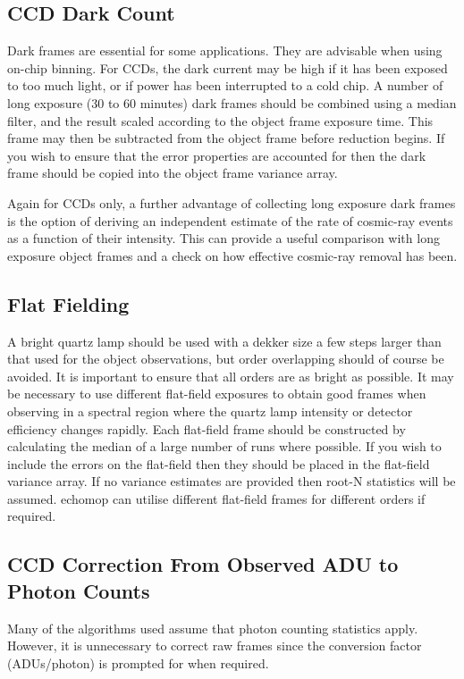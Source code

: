 \subsection{CCD Dark Count}
Dark frames are essential for some applications. They are advisable when
using on-chip binning. For CCDs, the dark current may be high if it has
been exposed to too much light, or if power has been interrupted to a cold
chip. A number of long exposure (30 to 60 minutes) dark frames should be
combined using a median filter, and the result scaled according to the
object frame exposure time. This frame may then be subtracted from the
object frame before reduction begins. If you wish to ensure that the
error properties are accounted for then the dark frame should be copied
into the object frame variance array.

Again for CCDs only, a further advantage of collecting long exposure
dark frames is the option of deriving an independent estimate of the
rate of cosmic-ray events as a function of their intensity.  This can
provide a useful comparison with long exposure object frames and a check
on how effective cosmic-ray removal has been.

\subsection{Flat Fielding}

A bright quartz lamp should be used with a dekker size a few steps
larger than that used for the object observations, but order overlapping
should of course be avoided. It is important to ensure that all orders
are as bright as possible. It may be necessary to use different
flat-field exposures to obtain good frames when observing in a spectral
region where the quartz lamp intensity or detector efficiency changes
rapidly. Each flat-field frame should be constructed by calculating the
median of a large number of runs where possible. If you wish to include
the errors on the flat-field then they should be placed in the flat-field
variance array.  If no variance estimates are provided then
root-N statistics will be assumed.
{\sc echomop} can utilise different flat-field frames for different orders if
required.

\subsection{CCD Correction From Observed
            ADU to Photon Counts}
Many of the algorithms used assume that photon counting statistics
apply. However, it is unnecessary to correct raw frames since the
conversion factor (ADUs/photon) is prompted for when required.



